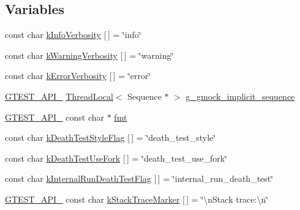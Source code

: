 \subsection*{Variables}
\begin{DoxyCompactItemize}
\item 
const char \mbox{\hyperlink{namespacetesting_1_1internal_a4f283e16e52a86b5d719a6d13dcec602}{k\+Info\+Verbosity}} \mbox{[}$\,$\mbox{]} = \char`\"{}info\char`\"{}
\item 
const char \mbox{\hyperlink{namespacetesting_1_1internal_aa5e3dfc43abf98b8fa8aa864cd208103}{k\+Warning\+Verbosity}} \mbox{[}$\,$\mbox{]} = \char`\"{}warning\char`\"{}
\item 
const char \mbox{\hyperlink{namespacetesting_1_1internal_af23bb61931365f262993225a3d2aef57}{k\+Error\+Verbosity}} \mbox{[}$\,$\mbox{]} = \char`\"{}error\char`\"{}
\item 
\mbox{\hyperlink{_obj__test_2lib_2googletest-release-1_88_81_2googletest_2include_2gtest_2internal_2gtest-port_8h_aa73be6f0ba4a7456180a94904ce17790}{G\+T\+E\+S\+T\+\_\+\+A\+P\+I\+\_\+}} \mbox{\hyperlink{classtesting_1_1internal_1_1_thread_local}{Thread\+Local}}$<$ Sequence $\ast$ $>$ \mbox{\hyperlink{namespacetesting_1_1internal_af4407fe8aeb1e43b2f58940736a20590}{g\+\_\+gmock\+\_\+implicit\+\_\+sequence}}
\item 
\mbox{\hyperlink{_obj__test_2lib_2googletest-release-1_88_81_2googletest_2include_2gtest_2internal_2gtest-port_8h_aa73be6f0ba4a7456180a94904ce17790}{G\+T\+E\+S\+T\+\_\+\+A\+P\+I\+\_\+}} const char $\ast$ \mbox{\hyperlink{namespacetesting_1_1internal_a503360987bcbc4722e1f2e10a14254d8}{fmt}}
\item 
const char \mbox{\hyperlink{namespacetesting_1_1internal_a8be730bac57cfd5a92d4aeea57ad499e}{k\+Death\+Test\+Style\+Flag}} \mbox{[}$\,$\mbox{]} = \char`\"{}death\+\_\+test\+\_\+style\char`\"{}
\item 
const char \mbox{\hyperlink{namespacetesting_1_1internal_aefe557a4dfcfd1cb9c7046a26b3c28bb}{k\+Death\+Test\+Use\+Fork}} \mbox{[}$\,$\mbox{]} = \char`\"{}death\+\_\+test\+\_\+use\+\_\+fork\char`\"{}
\item 
const char \mbox{\hyperlink{namespacetesting_1_1internal_abdcf0e0c1b0ec4fbb1e004c3805997d0}{k\+Internal\+Run\+Death\+Test\+Flag}} \mbox{[}$\,$\mbox{]} = \char`\"{}internal\+\_\+run\+\_\+death\+\_\+test\char`\"{}
\item 
\mbox{\hyperlink{_obj__test_2lib_2googletest-release-1_88_81_2googletest_2include_2gtest_2internal_2gtest-port_8h_aa73be6f0ba4a7456180a94904ce17790}{G\+T\+E\+S\+T\+\_\+\+A\+P\+I\+\_\+}} const char \mbox{\hyperlink{namespacetesting_1_1internal_abb38528ca6a45df265b19f5ccb3d16d9}{k\+Stack\+Trace\+Marker}} \mbox{[}$\,$\mbox{]} = \char`\"{}\textbackslash{}n\+Stack trace\+:\textbackslash{}n\char`\"{}

\end{DoxyCompactItemize}
